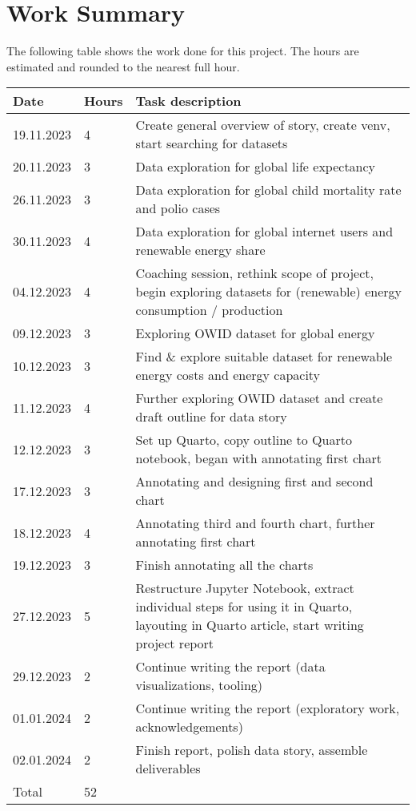 \documentclass{article}
\begin{document}
\newpage

\section{Work Summary}
The following table shows the work done for this project.
The hours are estimated and rounded to the nearest full hour.

\begin{table}[!ht]
    \centering
    \begin{tabular}{|p{2cm}|p{1cm}|p{7.5cm}|}
    \hline
        \textbf{Date} & \textbf{Hours} & \textbf{Task description} \\ \hline
        19.11.2023 & 4 & Create general overview of story, create venv, start searching for datasets \\ \hline
        20.11.2023 & 3 & Data exploration for global life expectancy \\ \hline
        26.11.2023 & 3 & Data exploration for global child mortality rate and polio cases \\ \hline
        30.11.2023 & 4 & Data exploration for global internet users and renewable energy share \\ \hline
        04.12.2023 & 4 & Coaching session, rethink scope of project, begin exploring datasets for (renewable) energy consumption / production \\ \hline
        09.12.2023 & 3 & Exploring OWID dataset for global energy \\ \hline
        10.12.2023 & 3 & Find \& explore suitable dataset for renewable energy costs and energy capacity \\ \hline
        11.12.2023 & 4 & Further exploring OWID dataset and create draft outline for data story \\ \hline
        12.12.2023 & 3 & Set up Quarto, copy outline to Quarto notebook, began with annotating first chart \\ \hline
        17.12.2023 & 3 & Annotating and designing first and second chart \\ \hline
        18.12.2023 & 4 & Annotating third and fourth chart, further annotating first chart \\ \hline
        19.12.2023 & 3 & Finish annotating all the charts \\ \hline
        27.12.2023 & 5 & Restructure Jupyter Notebook, extract individual steps for using it in Quarto, layouting in Quarto article, start writing project report \\ \hline
        29.12.2023 & 2 & Continue writing the report (data visualizations, tooling) \\ \hline
        01.01.2024 & 2 & Continue writing the report (exploratory work, acknowledgements) \\ \hline
        02.01.2024 & 2 & Finish report, polish data story, assemble deliverables \\ \hline
        \hline
        Total & 52 & \\ \hline
    \end{tabular}
\end{table}
\end{document}
